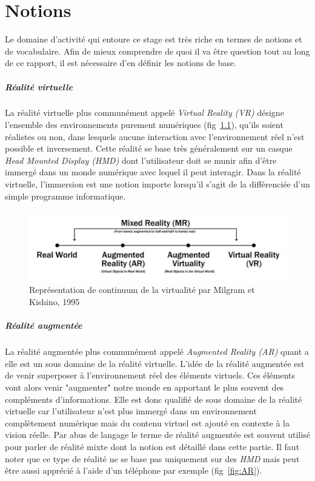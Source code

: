 \newpage
\chapter{Notions}
\label{chap:notions}

Le domaine d'activité qui entoure ce stage est très riche en termes de notions et de vocabulaire. Afin de mieux comprendre de quoi il va être question tout au long de ce rapport, il est nécessaire d'en définir les notions de base.

\paragraph{Réalité virtuelle}
La réalité virtuelle plus communément appelé \emph{Virtual Reality (VR)} désigne l'ensemble des environnements purement numériques (fig~\ref{fig:realityspectrum}), qu'ils soient réalistes ou non, dans lesquels aucune interaction avec l'environnement réel n'est possible et inversement. Cette réalité se base très généralement sur un casque \emph{Head Mounted Display (HMD)} dont l'utilisateur doit se munir afin d'être immergé dans un monde numérique avec lequel il peut interagir. Dans la réalité virtuelle, l'immersion est une notion importe lorsqu'il s'agit de la différenciée d'un simple programme informatique.

\begin{figure}[H]
\centering
\includegraphics[width=\linewidth]{images/RealitySpectrum}
\caption{Représentation de continuum de la virtualité par Milgram et Kishino, 1995\cite{milgram1995augmented}}
\label{fig:realityspectrum}
\end{figure}

\paragraph{Réalité augmentée}
La réalité augmentée plus communément appelé \emph{Augmented Reality (AR)} quant a elle est un sous domaine de la réalité virtuelle. L'idée de la réalité augmentée est de venir superposer à l'environnement réel des éléments virtuels. Ces éléments vont alors venir "augmenter" notre monde en apportant le plus souvent des compléments d'informations. Elle est donc qualifié de sous domaine de la réalité virtuelle car l'utilisateur n'est plus immergé dans un environnement complètement numérique mais du contenu virtuel est ajouté en contexte à la vision réelle. Par abus de langage le terme de réalité augmentée est souvent utilisé pour parler de réalité mixte dont la notion est détaillé dans cette partie.
Il faut noter que ce type de réalité ne se base pas uniquement sur des \emph{HMD} mais peut être aussi apprécié à l'aide d'un téléphone par exemple (fig~\ref{fig:AR}).

